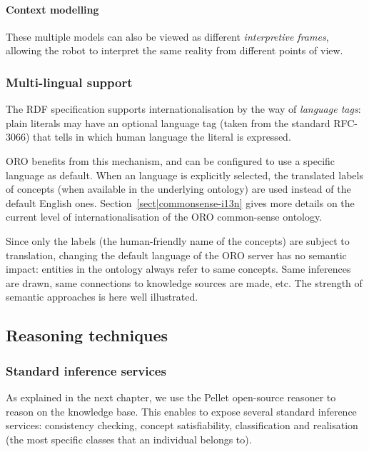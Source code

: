 \paragraph{Context modelling}

These multiple models can also be viewed as different \emph{interpretive
frames}, allowing the robot to interpret the same reality from different points
of view.


\subsubsection{Multi-lingual support}
\label{sect|multilingual}

The RDF specification supports internationalisation by the way of
\emph{language tags}: plain literals may have an optional language tag (taken
from the standard RFC-3066) that tells in which human language the literal is
expressed.

ORO benefits from this mechanism, and can be configured to use a specific
language as default. When an language is explicitly selected, the translated
labels of concepts (when available in the underlying ontology) are used instead
of the default English ones. Section~\ref{sect|commonsense-i13n} gives more
details on the current level of internationalisation of the ORO common-sense
ontology.

Since only the labels (\ie the human-friendly name of the concepts) are subject
to translation, changing the default language of the ORO server has no semantic
impact: entities in the ontology always refer to same concepts. Same inferences
are drawn, same connections to knowledge sources are made, etc. The strength of
semantic approaches is here well illustrated.

\subsection{Reasoning techniques}

\subsubsection{Standard inference services}

As explained in the next chapter, we use the Pellet open-source reasoner to
reason on the knowledge base. This enables to expose several standard inference
services: consistency checking, concept satisfiability, classification and
realisation (the most specific classes that an individual belongs to).

